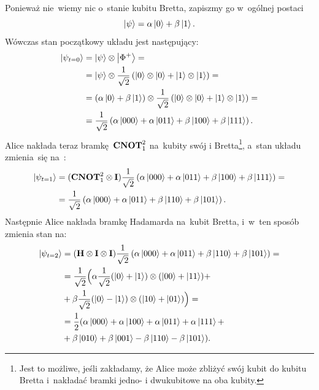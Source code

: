 Ponieważ nie~wiemy nic o~stanie kubitu Bretta, zapiszmy go w~ogólnej postaci
$$
	\ket{\psi} = \alpha \ket{0} + \beta \ket{1}.
$$
Wówczas stan początkowy układu jest następujący:
\begin{equation*}
	\begin{split}
		\ket{\psi_{t=0}} &=  \ket{\psi} \otimes \ket{\Phi^+}  =\\
		&= \ket{\psi} \otimes \frac{1}{\sqrt{2}}\left( \ket{0} \otimes \ket{0} +\ket{1} \otimes \ket{1} \right) = \\
		&= \left(\alpha \ket{0} + \beta  \ket{1}\right) \otimes \frac{1}{\sqrt{2}}\left( \ket{0} \otimes \ket{0} +\ket{1} \otimes \ket{1} \right)= \\
		&= \frac{1}{\sqrt{2}} \left(\alpha \ket{000} + \alpha \ket{011} + \beta  \ket{100} + \beta  \ket{111}  \right).
	\end{split}
\end{equation*}
Alice nakłada teraz bramkę~$\mathbf{CNOT}_1^2$ na~kubity swój i
Bretta\footnote{Jest to możliwe, jeśli zakładamy, że Alice może zbliżyć swój
	kubit do kubitu Bretta i~nakładać bramki jedno- i dwukubitowe na oba
	kubity.}, a~stan układu zmienia~się na~:
\begin{equation*}
	\begin{split}
		\ket{\psi_{t=1}} &= (\mathbf{CNOT}_1^2\otimes \mathbf{I}) \frac{1}{\sqrt{2}} \left(\alpha \ket{000} + \alpha \ket{011} + \beta \ket{100} + \beta \ket{111}  \right) =\\
		&=\frac{1}{\sqrt{2}} \left(\alpha \ket{000} + \alpha \ket{011} + \beta \ket{110} + \beta \ket{101}  \right).
	\end{split}
\end{equation*}
Następnie Alice nakłada bramkę Hadamarda na~kubit Bretta, i~w~ten sposób zmienia stan na:
\begin{equation*}
	\begin{split}
		\ket{\psi_{t=2}} &=( \mathbf{H}\otimes\mathbf{I}\otimes\mathbf{I}) \frac{1}{\sqrt{2}} \left(\alpha \ket{000} + \alpha \ket{011} + \beta \ket{110} + \beta \ket{101}  \right) =\\
		&= \frac{1}{\sqrt{2}} \Big(
		\alpha \frac{1}{\sqrt{2}}(\ket{0}+\ket{1})\otimes (\ket{00} +  \ket{11}) + \\
		& + \beta \frac{1}{\sqrt{2}}(\ket{0}-\ket{1})\otimes(\ket{10} + \ket{01}) \Big) =\\
		&= \frac{1}{2} (\alpha \ket{000} + \alpha \ket{100}  + \alpha \ket{011} + \alpha \ket{111} + \\
		&+ \beta \ket{010} + \beta \ket{001} - \beta \ket{110} - \beta \ket{101} ).
	\end{split}
\end{equation*}
